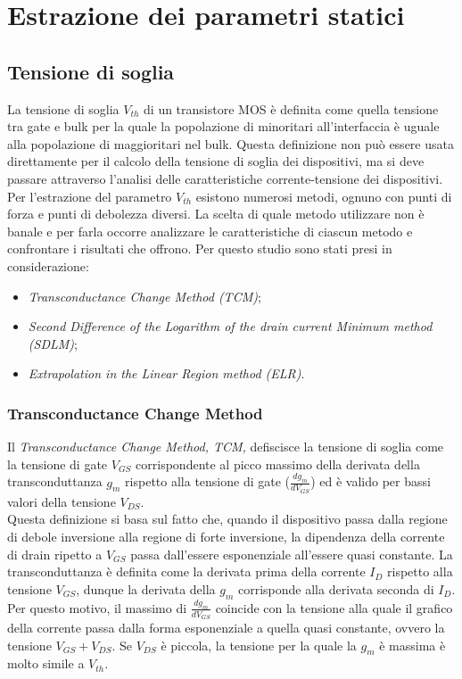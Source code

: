 \documentclass[12pt, letterpaper]{book}
\begin{document}
\chapter{Estrazione dei parametri statici}

\section{Tensione di soglia}

La tensione di soglia $V_{th}$ di un transistore MOS è definita come quella tensione tra gate e bulk per la quale la popolazione di minoritari all'interfaccia è uguale alla popolazione di maggioritari nel bulk. Questa definizione non può essere usata direttamente per il calcolo della tensione di soglia dei dispositivi, ma si deve passare attraverso l'analisi delle caratteristiche corrente-tensione dei dispositivi. \\
Per l'estrazione del parametro $V_{th}$ esistono numerosi metodi, ognuno con punti di forza e punti di debolezza diversi. La scelta di quale metodo utilizzare non è banale e per farla occorre analizzare le caratteristiche di ciascun metodo e confrontare i risultati che offrono. Per questo studio sono stati presi in considerazione:

\begin{itemize}
  \item \emph{Transconductance Change Method (TCM)};
  \item \emph{Second Difference of the Logarithm of the drain current Minimum method (SDLM)};
  \item \emph{Extrapolation in the Linear Region method (ELR)}.
\end{itemize}


\subsection{Transconductance Change Method}

Il \emph{Transconductance Change Method, TCM,} defiscisce la tensione di soglia come la tensione di gate $V_{GS}$ corrispondente al picco massimo della derivata della transconduttanza $g_m$ rispetto alla tensione di gate ($\frac{dg_m}{dV_ {GS}}$) ed è valido per bassi valori della tensione $V_{DS}$.\\
Questa definizione si basa sul fatto che, quando il dispositivo passa dalla regione di debole inversione alla regione di forte inversione, la dipendenza della corrente di drain ripetto a $V_{GS}$ passa dall'essere esponenziale all'essere quasi constante.
La transconduttanza è definita come la derivata prima della corrente $I_D$ rispetto alla tensione $V_{GS}$, dunque la derivata della $g_m$ corrisponde alla derivata seconda di $I_D$. Per questo motivo, il massimo di $\frac{dg_m}{dV_{GS}}$ coincide con la tensione alla quale il grafico della corrente passa dalla forma esponenziale a quella quasi constante, ovvero la tensione $V_{GS}+V_{DS}$. Se $V_{DS}$ è piccola, la tensione per la quale la $g_m$ è massima è molto simile a $V_{th}$.\\
\end{document}
